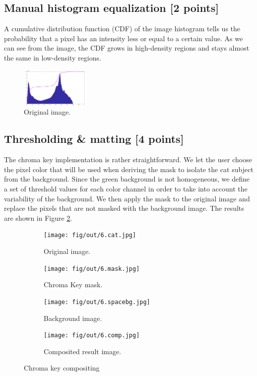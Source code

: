 \documentclass[tikz,14pt,fleqn]{article}
\begin{document}
\subsection{Manual histogram equalization [2 points]}
A cumulative distribution function (CDF) of the image histogram tells us the probability that a pixel has an intensity less or equal to a certain value. As we can see from the image, the CDF grows in high-density regions and stays almost the same in low-density regions. 
\begin{figure}
    \centering
    \includegraphics[width=0.3\textwidth]{fig/1.5.hist.png}
    \caption{Original image.}
\end{figure}

\subsection{Thresholding \& matting [4 points]}
The chroma key implementation is rather straightforward. We let the user choose the pixel color that will be used when deriving the mask to isolate the cat subject from the background. Since the green background is not homogeneous, we define a set of threshold values for each color channel in order to take into account the variability of the background. We then apply the mask to the original image and replace the pixels that are not masked with the background image. The results are shown in Figure \ref{fig:6.comp}. 
\begin{figure}[h!]
    \begin{center}
    \begin{subfigure}{0.22\textwidth}
        \centering
        \texttt{[image: fig/out/6.cat.jpg]}
        \caption{Original image.}
    \end{subfigure}
    \begin{subfigure}{0.22\textwidth}
        \centering
        \texttt{[image: fig/out/6.mask.jpg]}
        \caption{Chroma Key mask.}
    \end{subfigure}
    \begin{subfigure}{0.22\textwidth}
        \centering
        \texttt{[image: fig/out/6.spacebg.jpg]}
        \caption{Background image.}
    \end{subfigure}

    \begin{subfigure}{.67\textwidth}
        \centering
        \texttt{[image: fig/out/6.comp.jpg]}
        \caption{Composited result image.}
        \label{fig:6.comp}
    \end{subfigure}
\end{center}
    \caption{Chroma key compositing}
\end{figure}
\end{document}
